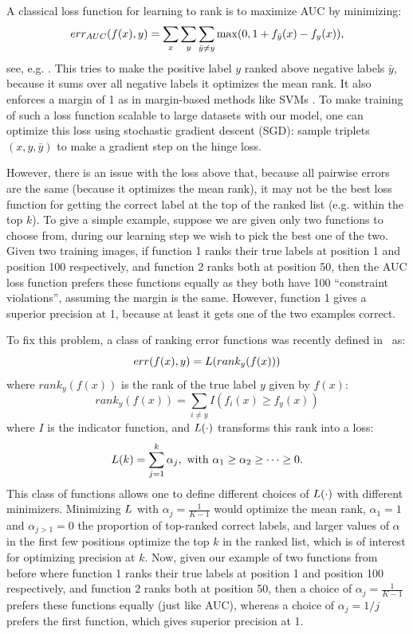 A classical loss function for learning to rank is to maximize AUC by minimizing:
\[
 err_{AUC}(f(x), y)  = \sum_x \sum_y \sum_{{\bar{y}} \neq y} \max(0,1+ f_{{\bar{y}}}(x) - f_y(x)),
\]
see, e.g.  \cite{herbrich2000large}.
This tries to make the positive label $y$ ranked above negative labels $\bar{y}$, because it sums
over all negative labels it optimizes the mean rank. It also enforces a margin of 1 as in margin-based 
methods like  SVMs \cite{svm}.
To make training of such a loss function scalable to large datasets 
with our model, one can optimize this loss using
 stochastic gradient descent (SGD):
sample triplets $(x, y, \bar{y})$ to make a gradient step on the hinge loss.

However, there is an issue with the loss above that, because all pairwise errors are the same 
(because it optimizes the mean rank), it may 
not be the best loss function for getting the correct label at the top of the ranked list (e.g. within the
top $k$). To give a simple example, 
suppose we are given only two functions to choose from, during our learning step we wish to  
pick the best one of the two.
Given two training images, if function 1 ranks their true labels at
position 1 and position 100 respectively, and function 2 ranks both at
position 50, then the AUC loss function prefers 
these functions equally as they both have 100 ``constraint violations'', 
assuming the margin is the same.
However, function 1 gives a superior precision at 1, because at least it gets one of the two examples correct.

To fix this problem, a class of ranking error functions was recently 
defined in~\cite{usunier:icml2009} as:
\begin{equation} \label{err-eq-orig}
err(f(x),y)  =  {L}(rank_y(f(x)))
\end{equation}
where $rank_y(f(x))$ is the rank of the true label $y$ given by $f(x)$:
\begin{equation*}
rank_y(f(x)) =  \sum_{i \neq y}  I( f_i(x) \geq f_y(x) )
\end{equation*}
where $I$ is the indicator function, 
and ${L}(\cdot)$ transforms this rank into a loss:
\begin{equation}
\label{def:lphi}
{L}(k)  =  \sum_{j=1}^k \alpha_j, \text{~with~} \alpha_1 \geq
\alpha_2\geq \dots \geq 0.
\end{equation}
This class of functions allows one to define different choices of ${L}(\cdot)$
with different minimizers. Minimizing ${L}$ with
$\alpha_j=\frac{1}{K-1}$ would optimize the mean rank, $\alpha_1=1$
and $\alpha_{j>1}=0$ the proportion of top-ranked correct
labels, and larger values of $\alpha$ in the first few positions optimize
the top $k$ in the ranked list, which is of interest for optimizing
precision at $k$. 
Now, given our example of two functions from before
where function 1 ranks their true labels at
position 1 and position 100 respectively, and function 2 ranks both at
position 50, then a choice of $\alpha_j=\frac{1}{K-1}$ prefers
these functions equally (just like AUC), whereas a choice of $\alpha_j=1/j$ prefers
the first function, which gives superior precision at 1.  

